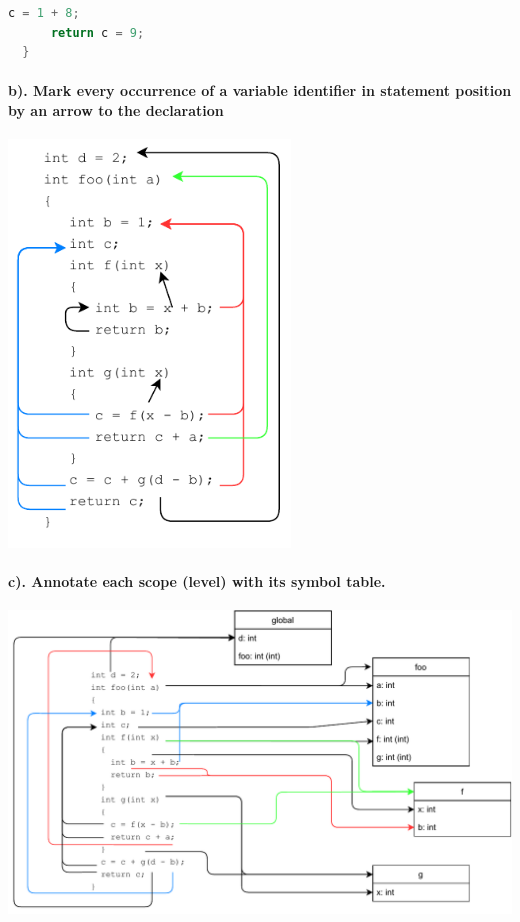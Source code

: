 \documentclass[hidelinks]{uva-inf-article}
\begin{document}
\begin{flushleft}
\begin{lstlisting}[basicstyle=\small, language=C, label=lst:foo8, caption=Execution steps of running foo(8), captionpos=b]
      c = 1 + 8;
      return c = 9;
  }
\end{lstlisting}
\newpage
\paragraph{b). Mark every occurrence of a variable identifier in statement position by an arrow to the declaration\\}
\includegraphics[width=7.5cm]{images/1b.pdf}
\paragraph{c). Annotate each scope (level) with its symbol table.\\}
\includegraphics[width=14cm]{images/1c.pdf}
\newpage

\end{flushleft}
\end{document}
